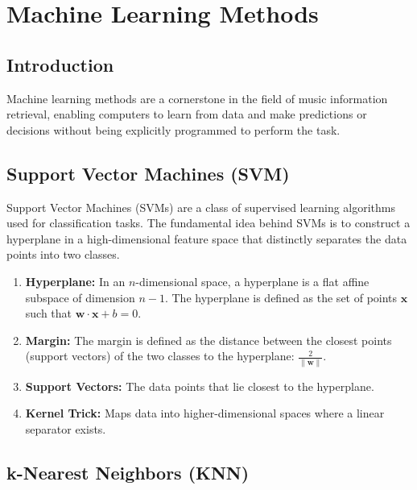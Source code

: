 

\section{Machine Learning Methods}
\label{sec:ml-methods}

\subsection{Introduction}

Machine learning methods are a cornerstone in the field of music information retrieval, enabling computers to learn from data and make predictions or decisions without being explicitly programmed to perform the task.

\subsection{Support Vector Machines (SVM)}

Support Vector Machines (SVMs) are a class of supervised learning algorithms used for classification tasks. The fundamental idea behind SVMs is to construct a hyperplane in a high-dimensional feature space that distinctly separates the data points into two classes.

\begin{enumerate}
  \item \textbf{Hyperplane:} In an $n$-dimensional space, a hyperplane is a flat affine subspace of dimension $n-1$. The hyperplane is defined as the set of points $\mathbf{x}$ such that $\mathbf{w} \cdot \mathbf{x} + b = 0$.
  \item \textbf{Margin:} The margin is defined as the distance between the closest points (support vectors) of the two classes to the hyperplane: $\frac{2}{\|\mathbf{w}\|}$.
  \item \textbf{Support Vectors:} The data points that lie closest to the hyperplane.
  \item \textbf{Kernel Trick:} Maps data into higher-dimensional spaces where a linear separator exists.
\end{enumerate}

\subsection{k-Nearest Neighbors (KNN)}

